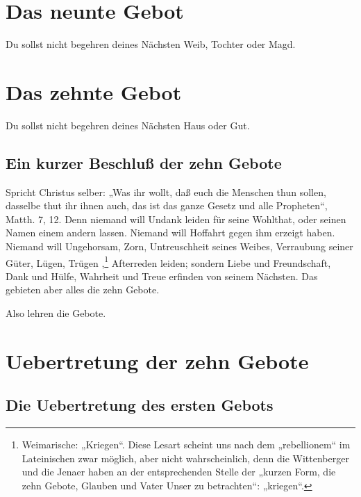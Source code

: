 \section{Das neunte Gebot}

\begin{schriftzitat}
Du sollst nicht begehren deines Nächsten Weib, Tochter oder Magd.
\end{schriftzitat}

\section{Das zehnte Gebot}

\begin{schriftzitat}
Du sollst nicht begehren deines Nächsten Haus oder Gut.
\end{schriftzitat}

\subsection{Ein kurzer Beschluß der zehn Gebote}

Spricht Christus selber: „Was ihr wollt, daß euch die Menschen thun sollen, dasselbe thut ihr ihnen auch, das ist das ganze Gesetz und alle Propheten“, Matth. 7, 12. Denn niemand will Undank leiden für seine Wohlthat, oder seinen Namen einem andern lassen. Niemand will Hoffahrt gegen ihm erzeigt haben. Niemand will Ungehorsam, Zorn, Untreuschheit seines Weibes, Verraubung seiner Güter, Lügen, Trügen
,\footnote{Weimarische: „Kriegen“. Diese Lesart scheint uns nach dem „rebellionem“ im Lateinischen zwar möglich, aber nicht wahrscheinlich, denn die Wittenberger und die Jenaer haben an der entsprechenden Stelle der „kurzen Form, die zehn Gebote, Glauben und Vater Unser zu betrachten“: „kriegen“.} Afterreden leiden; sondern Liebe und Freundschaft, Dank und Hülfe, Wahrheit und Treue erfinden von seinem Nächsten. Das gebieten aber alles die zehn Gebote.

Also lehren die Gebote.

\section{Uebertretung der zehn Gebote}

\subsection{Die Uebertretung des ersten Gebots}

